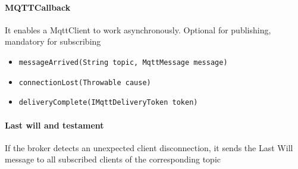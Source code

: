 \paragraph{MQTTCallback}
It enables a MqttClient to work asynchronously. Optional for publishing, mandatory for subscribing
\begin{itemize}
    \item \texttt{messageArrived(String topic, MqttMessage message)}
    \item \texttt{connectionLost(Throwable cause) }
    \item \texttt{deliveryComplete(IMqttDeliveryToken token)}
\end{itemize}

\paragraph{Last will and testament}
If the broker detects an unexpected client disconnection, it sends the Last Will message to all subscribed clients of the corresponding topic